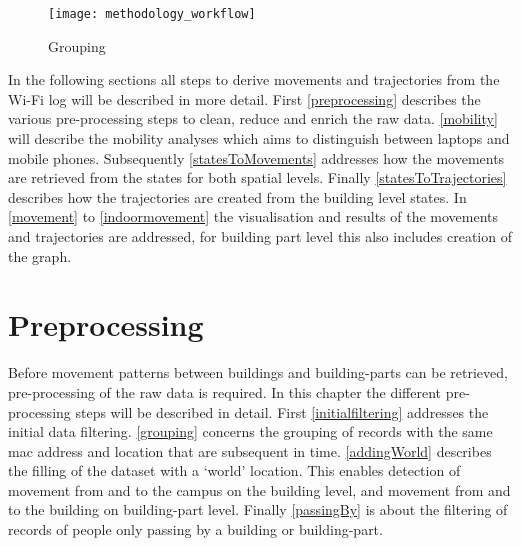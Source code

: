 \begin{figure}[H]
\centering
\texttt{[image: methodology\_workflow]}
\captionsetup{justification=centering}
\caption{Grouping}
\label{figure:workflow}
\end{figure}
In the following sections all steps to derive movements and trajectories from the Wi-Fi log will be described in more detail. First \autoref{preprocessing} describes the various pre-processing steps to clean, reduce and enrich the raw data. \autoref{mobility} will describe the mobility analyses which aims to distinguish between laptops and mobile phones. Subsequently \autoref{statesToMovements} addresses how the movements are retrieved from the states for both spatial levels. Finally \autoref{statesToTrajectories} describes how the trajectories are created from the building level states. In \autoref{movement} to \autoref{indoormovement} the visualisation and results of the movements and trajectories are addressed, for building part level this also includes creation of the graph. 

\section{Preprocessing}\label{preprocessing}
Before movement patterns between buildings and building-parts can be retrieved, pre-processing of the raw data is required. In this chapter the different pre-processing steps will be described in detail. First \autoref{initialfiltering} addresses the initial data filtering. \autoref{grouping} concerns the grouping of records with the same mac address and location that are subsequent in time. \autoref{addingWorld} describes the filling of the dataset with a ‘world’ location. This enables detection of movement from and to the campus on the building level, and movement from and to the building on building-part level. Finally \autoref{passingBy} is about the filtering of records of people only passing by a building or building-part.

